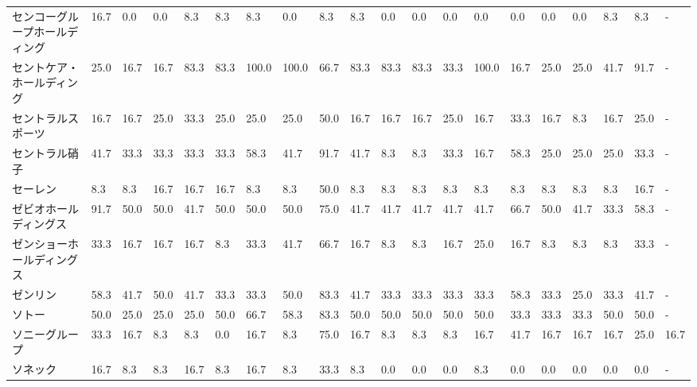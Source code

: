 \documentclass[a4paper，11pt]{jsarticle}
\begin{document}
\begin{longtable}[c]{lp{3mm}p{3mm}p{3mm}p{3mm}p{3mm}p{3mm}p{3mm}p{3mm}p{3mm}p{3mm}p{3mm}p{3mm}p{3mm}p{3mm}p{3mm}p{3mm}p{3mm}p{3mm}p{3mm}}
センコーグループホールディング &   16.7 &    0.0 &       0.0 &       8.3 &        8.3 &    8.3 &    0.0 &    8.3 &     8.3 &     0.0 &    0.0 &   0.0 &    0.0 &     0.0 &     0.0 &   0.0 &   8.3 &   8.3 &     - \\
セントケア・ホールディング   &   25.0 &   16.7 &      16.7 &      83.3 &       83.3 &  100.0 &  100.0 &   66.7 &    83.3 &    83.3 &   83.3 &  33.3 &  100.0 &    16.7 &    25.0 &  25.0 &  41.7 &  91.7 &     - \\
セントラルスポーツ       &   16.7 &   16.7 &      25.0 &      33.3 &       25.0 &   25.0 &   25.0 &   50.0 &    16.7 &    16.7 &   16.7 &  25.0 &   16.7 &    33.3 &    16.7 &   8.3 &  16.7 &  25.0 &     - \\
セントラル硝子         &   41.7 &   33.3 &      33.3 &      33.3 &       33.3 &   58.3 &   41.7 &   91.7 &    41.7 &     8.3 &    8.3 &  33.3 &   16.7 &    58.3 &    25.0 &  25.0 &  25.0 &  33.3 &     - \\
セーレン            &    8.3 &    8.3 &      16.7 &      16.7 &       16.7 &    8.3 &    8.3 &   50.0 &     8.3 &     8.3 &    8.3 &   8.3 &    8.3 &     8.3 &     8.3 &   8.3 &   8.3 &  16.7 &     - \\
ゼビオホールディングス     &   91.7 &   50.0 &      50.0 &      41.7 &       50.0 &   50.0 &   50.0 &   75.0 &    41.7 &    41.7 &   41.7 &  41.7 &   41.7 &    66.7 &    50.0 &  41.7 &  33.3 &  58.3 &     - \\
ゼンショーホールディングス   &   33.3 &   16.7 &      16.7 &      16.7 &        8.3 &   33.3 &   41.7 &   66.7 &    16.7 &     8.3 &    8.3 &  16.7 &   25.0 &    16.7 &     8.3 &   8.3 &   8.3 &  33.3 &     - \\
ゼンリン            &   58.3 &   41.7 &      50.0 &      41.7 &       33.3 &   33.3 &   50.0 &   83.3 &    41.7 &    33.3 &   33.3 &  33.3 &   33.3 &    58.3 &    33.3 &  25.0 &  33.3 &  41.7 &     - \\
ソトー             &   50.0 &   25.0 &      25.0 &      25.0 &       50.0 &   66.7 &   58.3 &   83.3 &    50.0 &    50.0 &   50.0 &  50.0 &   50.0 &    33.3 &    33.3 &  33.3 &  50.0 &  50.0 &     - \\
ソニーグループ         &   33.3 &   16.7 &       8.3 &       8.3 &        0.0 &   16.7 &    8.3 &   75.0 &    16.7 &     8.3 &    8.3 &   8.3 &   16.7 &    41.7 &    16.7 &  16.7 &  16.7 &  25.0 &  16.7 \\
ソネック            &   16.7 &    8.3 &       8.3 &      16.7 &        8.3 &   16.7 &    8.3 &   33.3 &     8.3 &     0.0 &    0.0 &   0.0 &    8.3 &     0.0 &     0.0 &   0.0 &   0.0 &   0.0 &     - \\

\end{longtable}
\end{document}
